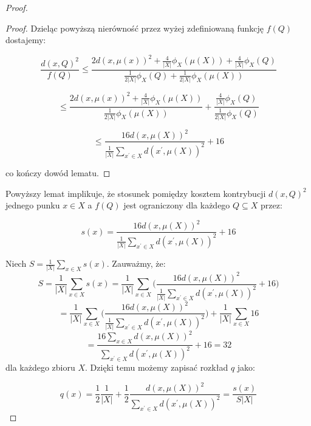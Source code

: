 \begin{proof}
\begin{proof}
    \noindent
    Dzieląc powyższą nierówność przez wyżej zdefiniowaną funkcję $f(Q)$ dostajemy:

    \begin{equation}
        \frac{d(x, Q)^2}{f(Q)} \leq \frac{2d(x, \mu(x))^2 +  \frac{4}{|X|} \phi_{X}(\mu(X))+ \frac{4}{|X|} \phi_{X}(Q)}{\frac{1}{2|X|}\phi_{X}(Q) + \frac{1}{2|X|}\phi_{X}(\mu(X))}
    \end{equation}

    \begin{equation}
        \leq \frac{2d(x, \mu(x))^2 +  \frac{4}{|X|} \phi_{X}(\mu(X))}{\frac{1}{2|X|}\phi_{X}(\mu(X))} + \frac{\frac{4}{|X|} \phi_{X}(Q)}{\frac{1}{2|X|}\phi_{X}(Q)}
    \end{equation}

    \begin{equation}
        \leq \frac{16d(x, \mu(X))^2}{\frac{1}{|X|}\sum_{x^{'} \in X}d(x^{'}, \mu(X))^2} + 16
    \end{equation}

    \noindent
    co kończy dowód lematu.
\end{proof}

\noindent
Powyższy lemat implikuje, że stosunek pomiędzy kosztem kontrybucji $d(x, Q)^2$ jednego punku $x \in X$ a $f(Q)$ jest ograniczony dla każdego $Q \subseteq X$ przez:

\begin{equation}
    s(x) = \frac{16d(x, \mu(X))^2}{\frac{1}{|X|}\sum_{x^{'} \in X}d(x^{'}, \mu(X))^2} + 16    
\end{equation}

\noindent
Niech $S = \frac{1}{|X|} \sum_{x \in X}s(x)$.
Zauważmy, że:
\begin{equation}
    S =  \frac{1}{|X|}  \sum_{x \in X}s(x)  =  \frac{1}{|X|} \sum_{x \in X} \Big( \frac{16d(x, \mu(X))^2}{\frac{1}{|X|}\sum_{x^{'} \in X}d(x^{'}, \mu(X))^2} + 16 \Big)
\end{equation}
\begin{equation}
    =  \frac{1}{|X|} \sum_{x \in X} \Big( \frac{16d(x, \mu(X))^2}{\frac{1}{|X|}\sum_{x^{'} \in X}d(x^{'}, \mu(X))^2} \Big) + \frac{1}{|X|} \sum_{x \in X} 16 
\end{equation}
\begin{equation}
    = \frac{16  \sum_{x \in X}  d(x, \mu(X))^2}{\sum_{x^{'} \in X}d(x^{'}, \mu(X))^2} + 16 = 32
\end{equation}
dla każdego zbioru $X$.
Dzięki temu możemy zapisać rozkład $q$ jako:

\begin{equation}
    q(x) = \frac{1}{2}\frac{1}{|X|} + \frac{1}{2}\frac{d(x, \mu(X))^2}{\sum_{x^{'} \in X}d(x^{'}, \mu(X))^2} = \frac{s(x)}{S|X|}
\end{equation}


\end{proof}
